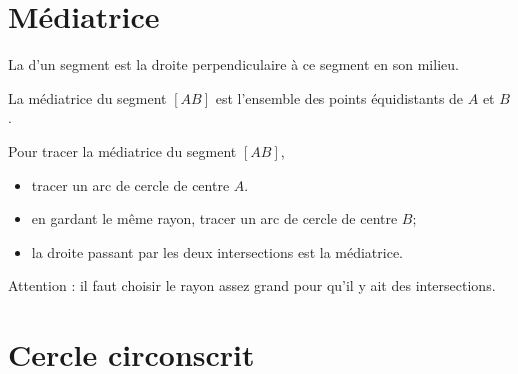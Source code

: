 


\section{Médiatrice}

\begin{definition}
    La  d'un segment est la droite perpendiculaire à ce segment en son milieu.
\end{definition}

\begin{center}
   
\end{center}

\begin{propriete}
    La médiatrice du segment \( [AB]\) est l'ensemble des points équidistants de \( A\) et \( B\).
\end{propriete}

Pour tracer la médiatrice du segment \( [AB]\), 
\begin{itemize}
    \item tracer un arc de cercle de centre \( A\).
    \item en gardant le même rayon, tracer un arc de cercle de centre \( B\);
    \item la droite passant par les deux intersections est la médiatrice.
\end{itemize}
Attention : il faut choisir le rayon assez grand pour qu'il y ait des intersections.

\begin{center}
   
\end{center}

\section{Cercle circonscrit}

